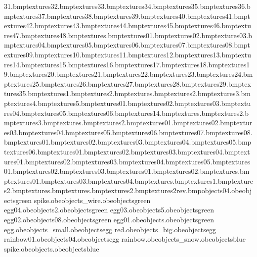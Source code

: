 31.bmp textures\sharprock32.bmp textures\sharprock33.bmp textures\sharprock34.bmp textures\sharprock35.bmp textures\sharprock36.bmp textures\sharprock37.bmp textures\sharprock38.bmp textures\sharprock39.bmp textures\sharprock40.bmp textures\sharprock41.bmp textures\sharprock42.bmp textures\sharprock43.bmp textures\sharprock44.bmp textures\sharprock45.bmp textures\sharprock46.bmp textures\sharprock47.bmp textures\sharprock48.bmp textures\sign.bmp textures\sign01.bmp textures\sign02.bmp textures\sign03.bmp textures\sign04.bmp textures\sign05.bmp textures\sign06.bmp textures\sign07.bmp textures\sign08.bmp textures\sign09.bmp textures\sign10.bmp textures\sign11.bmp textures\sign12.bmp textures\sign13.bmp textures\sign14.bmp textures\sign15.bmp textures\sign16.bmp textures\sign17.bmp textures\sign18.bmp textures\sign19.bmp textures\sign20.bmp textures\sign21.bmp textures\sign22.bmp textures\sign23.bmp textures\sign24.bmp textures\sign25.bmp textures\sign26.bmp textures\sign27.bmp textures\sign28.bmp textures\sign29.bmp textures\sign35.bmp textures\simplewall1.bmp textures\simplewall2.bmp textures\simplewallextra.bmp textures\simplewallextra2.bmp textures\simplewallextra3.bmp textures\simplewallextra4.bmp textures\simplewallextra5.bmp textures\slide01.bmp textures\slide02.bmp textures\slide03.bmp textures\slide04.bmp textures\slide05.bmp textures\slide06.bmp textures\slide14.bmp textures\slurp.bmp textures\slurp2.bmp textures\slurp3.bmp textures\snow.bmp textures\snow2.bmp textures\snowdecal01.bmp textures\snowdecal02.bmp textures\snowdecal03.bmp textures\snowdecal04.bmp textures\snowdecal05.bmp textures\snowdecal06.bmp textures\snowdecal07.bmp textures\snowdecal08.bmp textures\snowtograss01.bmp textures\snowtograss02.bmp textures\snowtograss03.bmp textures\snowtograss04.bmp textures\snowtograss05.bmp textures\snowtograss06.bmp textures\snowtograsscorner01.bmp textures\snowtograsscorner02.bmp textures\snowtograsscorner03.bmp textures\snowtograsscorner04.bmp textures\snowtopath01.bmp textures\snowtopath02.bmp textures\snowtopath03.bmp textures\snowtopath04.bmp textures\snowtopath05.bmp textures\snowtopathcorner01.bmp textures\snowtopathcorner02.bmp textures\snowtopathcorner03.bmp textures\snowtopathdecal01.bmp textures\snowtopathdecal02.bmp textures\snowtree.bmp textures\snowtree01.bmp textures\snowtree03.bmp textures\snowtree04.bmp textures\strawfloor.bmp textures\strings1.bmp textures\strings2.bmp textures\tabletop.bmp textures\tazsign.bmp textures\tazsign2.bmp textures\tazsign2rev.bmp objects\anvil04.obe objects\plant green spike.obe objects\bank_wire.obe objects\plant green egg04.obe objects\zoogate2.obe objects\plant green egg03.obe objects\woodplank5.obe objects\plant green egg02.obe objects\woodplank08.obe objects\plant green egg01.obe objects\woodplank.obe objects\plant green egg.obe objects\water_small.obe objects\plant egg red.obe objects\water_big.obe objects\plant egg rainbow01.obe objects\tv04.obe objects\plant egg rainbow.obe objects\trashcan_snow.obe objects\plant blue spike.obe objects\trashcan.obe objects\plant blue 